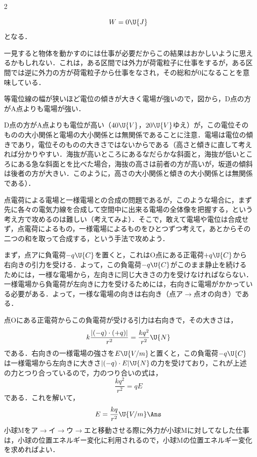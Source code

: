 \begin{multicols}{2}
\begin{komon}
\begin{bekkai}
       \[W=0\U{J}\]
       となる．
       \end{bekkai}
       \begin{chuu}
       一見すると物体を動かすのには仕事が必要だからこの結果はおかしいように思えるかもしれない．これは，ある区間では外力が荷電粒子に仕事をするが，ある区間では逆に外力の方が荷電粒子から仕事をなされ，その総和が$0$になることを意味している．
       \end{chuu}
 等電位線の幅が狭いほど電位の傾きが大きく電場が強いので，図から，$\mathrm{D}$点の方が$\mathrm{A}$点よりも電場が強い．\Ans
       \begin{chuu}
       $\mathrm{D}$点の方が$\mathrm{A}$点よりも電位が高い（$40\U{V}$，$20\U{V}$ゆえ）が，この{\gtfamily 電位そのものの大小関係と電場の大小関係とは無関係}であることに注意．電場は電位の傾きであり，電位そのものの大きさではないからである（高さと傾きに直して考えれば分かりやすい．海抜が高いところにあるなだらかな斜面と，海抜が低いところにある急な斜面とを比べた場合，海抜の高さは前者の方が高いが，坂道の傾斜は後者の方が大きい．このように，高さの大小関係と傾きの大小関係とは無関係である）．
       \end{chuu}
\end{komon}

\par\nopagebreak
\begin{sisin}
点電荷による電場と一様電場との合成の問題であるが，このような場合に，まず先に各々の電気力線を合成して空間中に出来る電場の全体像を把握する，という考え方で攻めるのは難しい（考えてみよ）．そこで，敢えて電場や電位は合成せず，点電荷によるもの，一様電場によるものをひとつずつ考えて，あとからその二つの和を取って合成する，という手法で攻めよう．
\end{sisin}
\KaiHead
\begin{komon}
 まず，点アに負電荷$-q\U{C}$を置くと，これは$\mathrm{O}$点にある正電荷$+q\U{C}$から右向きの引力を受ける．よって，この負電荷$-q\U{C}$がこのまま静止を続けるためには，一様な電場から，左向きに同じ大きさの力を受けなければならない．一様電場から{\gtfamily 負電荷が左向きに力を受ける}ためには，右向きに電場がかかっている必要がある．よって，一様な電場の向きは右向き（点ア$\rightarrow$点オの向き）である．\Ans

       点$\mathrm{O}$にある正電荷からこの負電荷が受ける引力は右向きで，その大きさは，
       \[k\frac{|(-q)\cdot(+q)|}{r^2}=\frac{kq^2}{r^2}\U{N}\]
       である．右向きの一様電場の強さを$E\U{V/m}$と置くと，この負電荷$-q\U{C}$は一様電場から左向きに大きさ$|(-q)\cdot E|\U{N}$の力を受けており，これが上述の力とつり合っているので，力のつり合いの式は，
       \[\frac{kq^2}{r^2}=qE\]
       である．これを解いて，
       \[E=\frac{kq}{r^2}\U{V/m}\Ans\]
 小球$\mathrm{M}$をア$\rightarrow$イ$\rightarrow$ウ$\rightarrow$エと移動させる際に外力が小球$\mathrm{M}$に対してなした仕事は，小球の位置エネルギー変化に利用されるので，小球$\mathrm{M}$の位置エネルギー変化を求めればよい．


\end{komon}
\end{multicols}
